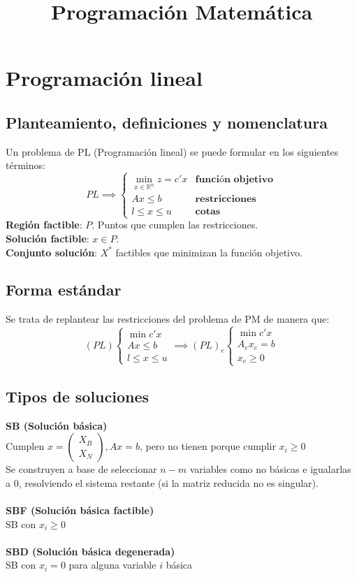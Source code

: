 \documentclass{myclass}
\title{Programación Matemática}
\begin{document}
\maketitle
\tableofcontents
\newpage

\section{Programación lineal}
\subsection{Planteamiento, definiciones y nomenclatura}
Un problema de PL (Programación lineal) se puede formular en los siguientes términos:
$$ PL \implies 
\begin{cases}
\min_{x\in \mathbb{R}^n} z = c'x & \textbf{función objetivo} \\
Ax\leq b & \textbf{restricciones}  \\
l\leq x\leq u & \textbf{cotas} 
\end{cases}
$$
\textbf{Región factible}: $P$. Puntos que cumplen las restricciones. \\
\textbf{Solución factible}: $x\in P$. \\
\textbf{Conjunto solución}: $X^*$ factibles que minimizan la función objetivo. \\

\subsection{Forma estándar}
Se trata de replantear las restricciones del problema de PM de manera que:
$$
(PL)
\begin{cases}
    \min c'x \\
    Ax\leq b \\
    l\leq x\leq u
\end{cases}
\implies
(PL)_e
\begin{cases}
    \min c'x \\
    A_ex_e= b \\
    x_e\geq 0
\end{cases}
$$
\subsection{Tipos de soluciones}
\textbf{SB (Solución básica)} \\
Cumplen $x=\begin{pmatrix} X_B\\X_N \end{pmatrix}, Ax=b$, pero no tienen porque cumplir $x_i\geq 0$\\
Se construyen a base de seleccionar $n-m$ variables como no básicas e igualarlas a 0, resolviendo el sistema restante (si la matriz reducida no es singular).\\
\\
\textbf{SBF (Solución básica factible)} \\
SB con $x_i\geq 0$ \\
\\
\textbf{SBD (Solución básica degenerada)} \\
SB con $x_i = 0$ para alguna variable $i$ básica \\
\end{document}
